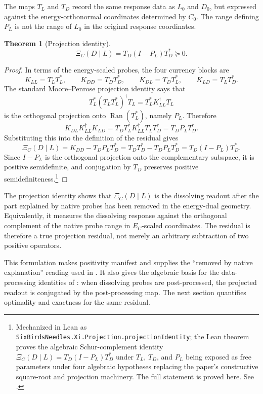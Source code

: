\documentclass[11pt]{article}
\DeclareMathOperator{\Ran}{Ran}
\newtheorem{theorem}{Theorem}[section]
\theoremstyle{definition}
\begin{document}
The maps \(T_L\) and \(T_D\) record the same response data as \(L_0\) and
\(D_0\), but expressed against the energy-orthonormal coordinates determined by
\(C_0\).  The range defining \(P_L\) is not the range of \(L_0\) in the original
response coordinates.

\begin{theorem}[Projection identity]\label{thm:xi:projection-identity}
\[
  \boxed{\Xi_C(D\mid L)=T_D(I-P_L)T_D^*\succeq 0.}
\]
\end{theorem}

\begin{proof}
In terms of the energy-scaled probes, the four currency blocks are
\[
  K_{LL}=T_LT_L^*,
  \qquad
  K_{DD}=T_DT_D^*,
  \qquad
  K_{DL}=T_DT_L^*,
  \qquad
  K_{LD}=T_LT_D^*.
\]
The standard Moore--Penrose projection identity
\citep{Penrose1956BestApprox,Halmos1982HilbertSpace} says that
\[
  T_L^*(T_LT_L^*)^\dagger T_L=T_L^*K_{LL}^\dagger T_L
\]
is the orthogonal projection onto \(\Ran(T_L^*)\), namely \(P_L\).  Therefore
\[
  K_{DL}K_{LL}^\dagger K_{LD}
  =
  T_DT_L^*K_{LL}^\dagger T_LT_D^*
  =
  T_D P_L T_D^*.
\]
Substituting this into the definition of the residual gives
\[
  \Xi_C(D\mid L)
  =
  K_{DD}-T_D P_L T_D^*
  =
  T_D T_D^*-T_D P_L T_D^*
  =
  T_D(I-P_L)T_D^*.
\]
Since \(I-P_L\) is the orthogonal projection onto the complementary subspace,
it is positive semidefinite, and conjugation by \(T_D\) preserves positive
semidefiniteness.\footnote{Mechanized in Lean as \texttt{SixBirdsNeedles.Xi.Projection.projectionIdentity}; the Lean theorem proves the algebraic Schur-complement identity \(\Xi_C(D\mid L)=T_D(I-P_L)T_D^*\) under \(T_L\), \(T_D\), and \(P_L\) being exposed as free parameters under four algebraic hypotheses replacing the paper's constructive square-root and projection machinery.  The full statement is proved here.  See .}
\end{proof}

The projection identity shows that \(\Xi_C(D\mid L)\) is the dissolving readout
after the part explained by native probes has been removed in the energy-dual
geometry.  Equivalently, it measures the dissolving response against the
orthogonal complement of the native probe range in \(E_C\)-scaled coordinates.
The residual is therefore a true projection residual, not merely an arbitrary
subtraction of two positive operators.

This formulation makes positivity manifest and supplies the ``removed by native
explanation'' reading used in .  It also gives the
algebraic basis for the data-processing identities of
: when dissolving probes are post-processed, the
projected readout is conjugated by the post-processing map.  The next section
quantifies optimality and exactness for the same residual.
\end{document}
